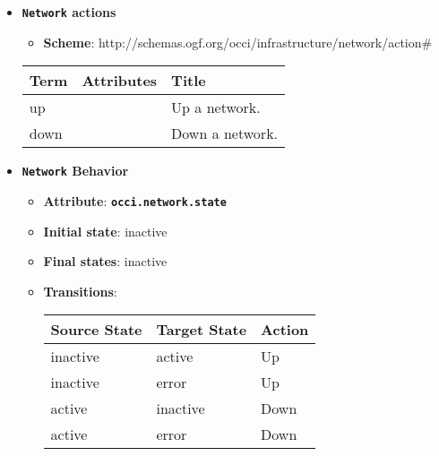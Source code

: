 \begin{itemize}
\item \textbf{\texttt{Network} actions}

\begin{itemize}
	\item \textbf{Scheme}: http://schemas.ogf.org/occi/infrastructure/network/action\#
\end{itemize}

\begin{center}
\begin{tabular}{|l|l|l|}
  \hline
  \textbf{Term}  & \textbf{Attributes} & \textbf{Title} \\
  \hline  
  up & & Up a network. \\
  \hline
  down & & Down a network. \\
  \hline
\end{tabular}
\end{center}
\end{itemize}

\begin{itemize}
\item \textbf{\texttt{Network} Behavior}
\begin{itemize}
\item \textbf{Attribute}: \textbf{\texttt{occi.network.state}}
\item \textbf{Initial state}: inactive
\item \textbf{Final states}:  	inactive
\item \textbf{Transitions}:

\begin{center}
\begin{tabular}{|l|l|l|}
  \hline
  \textbf{Source State} & \textbf{Target State} & \textbf{Action} \\
  \hline  
  inactive & active & Up  \\
  \hline
  inactive & error & Up  \\
  \hline
  active & inactive & Down  \\
  \hline
  active & error & Down  \\
  \hline
\end{tabular}
\end{center}
\end{itemize}
\end{itemize}

